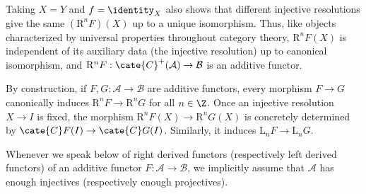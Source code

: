 Taking $X=Y$ and $f=\identity_X$ also shows that different injective
resolutions give the same $(\mathrm{R}^nF)(X)$ up to a unique isomorphism.
Thus, like objects characterized by universal properties throughout category
theory, $\mathrm{R}^nF(X)$ is independent of its auxiliary data (the injective
resolution) up to canonical isomorphism, and
$\mathrm{R}^nF:\cate{C}^+(\mathcal{A})\to\mathcal{B}$ is an additive functor.

By construction, if $F,G:\mathcal{A}\to\mathcal{B}$ are additive functors,
every morphism $F\to G$ canonically induces
$\mathrm{R}^nF\to\mathrm{R}^nG$ for all $n\in\Z$. Once an injective resolution
$X\to I$ is fixed, the morphism
$\mathrm{R}^nF(X)\to\mathrm{R}^nG(X)$ is concretely determined by
$\cate{C}F(I)\to\cate{C}G(I)$. Similarly, it induces
$\mathrm{L}_nF\to\mathrm{L}_nG$.

\begin{convention}
	Whenever we speak below of right derived functors (respectively left
	derived functors) of an additive functor
	$F:\mathcal{A}\to\mathcal{B}$, we implicitly assume that $\mathcal{A}$ has
	enough injectives (respectively enough projectives).
\end{convention}


